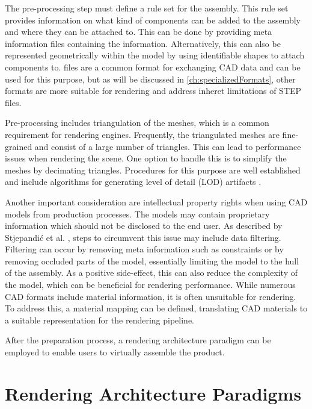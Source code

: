 The pre-processing step must define a rule set for the assembly. This rule set provides information on what kind of components can be added to the assembly and where they can be attached to. This can be done by providing meta information files containing the information. Alternatively, this can also be represented geometrically within the model by using identifiable shapes to attach components to.  files are a common format for exchanging \gls{CAD} data and can be used for this purpose, but as will be discussed in \autoref{ch:specializedFormats}, other formats are more suitable for rendering and address inheret limitations of \gls{STEP} files.

Pre-processing includes triangulation of the meshes, which is a common requirement for rendering engines. Frequently, the triangulated meshes are fine-grained and consist of a large number of triangles. This can lead to performance issues when rendering the scene. One option to handle this is to simplify the meshes by decimating triangles. Procedures for this purpose are well established and include algorithms for generating level of detail (\gls{LOD}) artifacts \cite{luebke2003level}.

Another important consideration are intellectual property rights when using \gls{CAD} models from production processes. The models may contain proprietary information which should not be disclosed to the end user. As described by Stjepandić et al. \cite{ipr}, steps to circumvent this issue may include data filtering. Filtering can occur by removing meta information such as constraints or by removing occluded parts of the model, essentially limiting the model to the hull of the assembly. As a positive side-effect, this can also reduce the complexity of the model, which can be beneficial for rendering performance.
While numerous \gls{CAD} formats include material information, it is often unsuitable for rendering. To address this, a material mapping can be defined, translating \gls{CAD} materials to a suitable representation for the rendering pipeline.

After the preparation process, a rendering architecture paradigm can be employed to enable users to virtually assemble the product.

\section{Rendering Architecture Paradigms}

